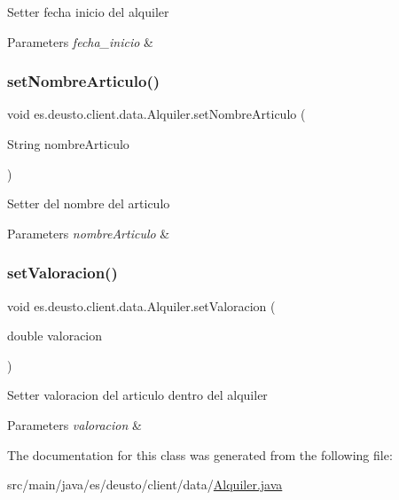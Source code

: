 Setter fecha inicio del alquiler 
\begin{DoxyParams}{Parameters}
{\em fecha\+\_\+inicio} & \\
\hline
\end{DoxyParams}
\mbox{\label{classes_1_1deusto_1_1client_1_1data_1_1_alquiler_aa4620743ebe7401112f0f654cbc59223}} 
\subsubsection{\texorpdfstring{setNombreArticulo()}{setNombreArticulo()}}
{\footnotesize\ttfamily void es.\+deusto.\+client.\+data.\+Alquiler.\+set\+Nombre\+Articulo (\begin{DoxyParamCaption}\item[{String}]{nombre\+Articulo }\end{DoxyParamCaption})}

Setter del nombre del articulo 
\begin{DoxyParams}{Parameters}
{\em nombre\+Articulo} & \\
\hline
\end{DoxyParams}
\mbox{\label{classes_1_1deusto_1_1client_1_1data_1_1_alquiler_af55279120b472668048444bc14ce8bcb}} 
\subsubsection{\texorpdfstring{setValoracion()}{setValoracion()}}
{\footnotesize\ttfamily void es.\+deusto.\+client.\+data.\+Alquiler.\+set\+Valoracion (\begin{DoxyParamCaption}\item[{double}]{valoracion }\end{DoxyParamCaption})}

Setter valoracion del articulo dentro del alquiler 
\begin{DoxyParams}{Parameters}
{\em valoracion} & \\
\hline
\end{DoxyParams}


The documentation for this class was generated from the following file\+:\begin{DoxyCompactItemize}
\item 
src/main/java/es/deusto/client/data/\mbox{\hyperlink{_alquiler_8java}{Alquiler.\+java}}\end{DoxyCompactItemize}
